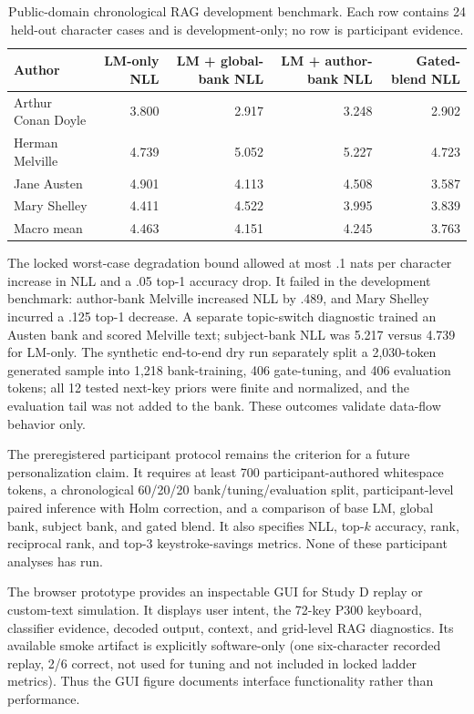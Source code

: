 \documentclass[final,5p,times,twocolumn,authoryear]{elsarticle}
\begin{document}
\begin{table}[t]
\centering\small
\caption{Public-domain chronological RAG development benchmark. Each row contains 24 held-out character cases and is development-only; no row is participant evidence.}\label{tab:rag-development}
\begin{tabular}{lrrrr}
\toprule
Author & LM-only NLL & LM + global-bank NLL & LM + author-bank NLL & Gated-blend NLL\\
\midrule
Arthur Conan Doyle & 3.800 & 2.917 & 3.248 & 2.902\\
Herman Melville & 4.739 & 5.052 & 5.227 & 4.723\\
Jane Austen & 4.901 & 4.113 & 4.508 & 3.587\\
Mary Shelley & 4.411 & 4.522 & 3.995 & 3.839\\
Macro mean & 4.463 & 4.151 & 4.245 & 3.763\\
\bottomrule
\end{tabular}
\end{table}

The locked worst-case degradation bound allowed at most .1 nats per character increase in NLL and a .05 top-1 accuracy drop. It failed in the development benchmark: author-bank Melville increased NLL by .489, and Mary Shelley incurred a .125 top-1 decrease. A separate topic-switch diagnostic trained an Austen bank and scored Melville text; subject-bank NLL was 5.217 versus 4.739 for LM-only. The synthetic end-to-end dry run separately split a 2,030-token generated sample into 1,218 bank-training, 406 gate-tuning, and 406 evaluation tokens; all 12 tested next-key priors were finite and normalized, and the evaluation tail was not added to the bank. These outcomes validate data-flow behavior only.

The preregistered participant protocol remains the criterion for a future personalization claim. It requires at least 700 participant-authored whitespace tokens, a chronological 60/20/20 bank/tuning/evaluation split, participant-level paired inference with Holm correction, and a comparison of base LM, global bank, subject bank, and gated blend. It also specifies NLL, top-$k$ accuracy, rank, reciprocal rank, and top-3 keystroke-savings metrics. None of these participant analyses has run.

The browser prototype provides an inspectable GUI for Study D replay or custom-text simulation. It displays user intent, the 72-key P300 keyboard, classifier evidence, decoded output, context, and grid-level RAG diagnostics. Its available smoke artifact is explicitly software-only (one six-character recorded replay, 2/6 correct, not used for tuning and not included in locked ladder metrics). Thus the GUI figure documents interface functionality rather than performance.
\end{document}
